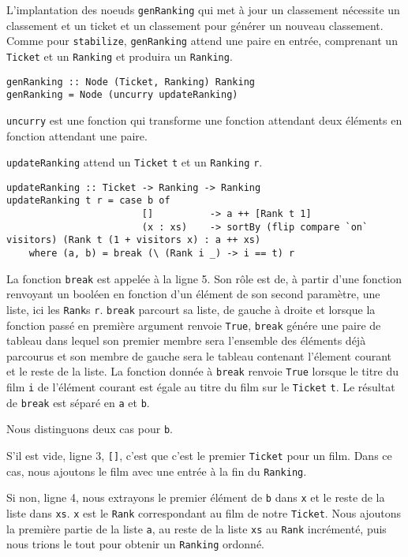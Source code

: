 \documentclass{llncs}
\begin{document}
L'implantation des noeuds \lstinline{genRanking} qui met à jour un classement
nécessite un classement et un ticket et un classement pour générer un nouveau classement.
Comme pour \lstinline{stabilize}, \lstinline{genRanking} attend une paire en
entrée, comprenant un \lstinline{Ticket} et un \lstinline{Ranking} et produira
un \lstinline{Ranking}.
\begin{lstlisting}
genRanking :: Node (Ticket, Ranking) Ranking
genRanking = Node (uncurry updateRanking)
\end{lstlisting}
\lstinline{uncurry} est une fonction qui transforme une fonction attendant deux éléments
en fonction attendant une paire.

\lstinline{updateRanking} attend un \lstinline{Ticket} \lstinline{t} et un
\lstinline{Ranking} \lstinline{r}.
\begin{lstlisting}
updateRanking :: Ticket -> Ranking -> Ranking
updateRanking t r = case b of
                        []          -> a ++ [Rank t 1]
                        (x : xs)    -> sortBy (flip compare `on` visitors) (Rank t (1 + visitors x) : a ++ xs)
    where (a, b) = break (\ (Rank i _) -> i == t) r
\end{lstlisting}
La fonction \lstinline{break} est appelée à la ligne 5.
Son rôle est de, à partir d'une fonction renvoyant un booléen en fonction d'un
élément de son second paramètre, une liste, ici les \lstinline{Rank}s \lstinline{r}.
\lstinline{break} parcourt sa liste, de gauche à droite et lorsque la fonction passé
en première argument renvoie \lstinline{True}, \lstinline{break} génére une
paire de tableau dans lequel son premier membre sera l'ensemble des éléments déjà
parcourus et son membre de gauche sera le tableau contenant l'élement courant et
le reste de la liste.
La fonction donnée à \lstinline{break} renvoie \lstinline{True} lorsque le titre
du film \lstinline{i} de l'élément courant est égale au titre du film sur le
\lstinline{Ticket} \lstinline{t}.
Le résultat de \lstinline{break} est séparé en \lstinline{a} et \lstinline{b}.

Nous distinguons deux cas pour \lstinline{b}.

S'il est vide, ligne 3, \lstinline{[]}, c'est que c'est le premier \lstinline{Ticket}
pour un film.
Dans ce cas, nous ajoutons le film avec une entrée à la fin du \lstinline{Ranking}.

Si non, ligne 4, nous extrayons le premier élément de \lstinline{b} dans \lstinline{x}
et le reste de la liste dans \lstinline{xs}.
\lstinline{x} est le \lstinline{Rank} correspondant au film de notre \lstinline{Ticket}.
Nous ajoutons la première partie de la liste \lstinline{a}, au reste de la liste
\lstinline{xs} au \lstinline{Rank} incrémenté, puis nous trions le tout pour obtenir
un \lstinline{Ranking} ordonné.
\end{document}

